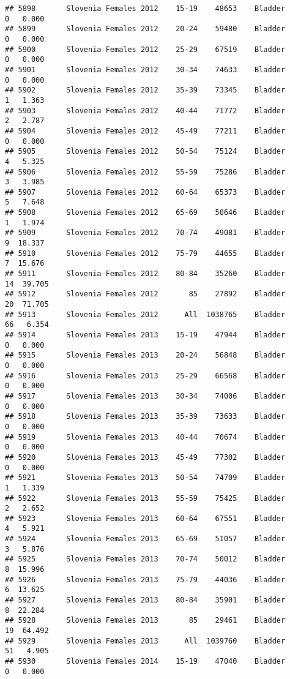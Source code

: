 \documentclass[
]{article}
\begin{document}
\begin{verbatim}
## 5898       Slovenia Females 2012    15-19    48653    Bladder      0   0.000
## 5899       Slovenia Females 2012    20-24    59480    Bladder      0   0.000
## 5900       Slovenia Females 2012    25-29    67519    Bladder      0   0.000
## 5901       Slovenia Females 2012    30-34    74633    Bladder      0   0.000
## 5902       Slovenia Females 2012    35-39    73345    Bladder      1   1.363
## 5903       Slovenia Females 2012    40-44    71772    Bladder      2   2.787
## 5904       Slovenia Females 2012    45-49    77211    Bladder      0   0.000
## 5905       Slovenia Females 2012    50-54    75124    Bladder      4   5.325
## 5906       Slovenia Females 2012    55-59    75286    Bladder      3   3.985
## 5907       Slovenia Females 2012    60-64    65373    Bladder      5   7.648
## 5908       Slovenia Females 2012    65-69    50646    Bladder      1   1.974
## 5909       Slovenia Females 2012    70-74    49081    Bladder      9  18.337
## 5910       Slovenia Females 2012    75-79    44655    Bladder      7  15.676
## 5911       Slovenia Females 2012    80-84    35260    Bladder     14  39.705
## 5912       Slovenia Females 2012       85    27892    Bladder     20  71.705
## 5913       Slovenia Females 2012      All  1038765    Bladder     66   6.354
## 5914       Slovenia Females 2013    15-19    47944    Bladder      0   0.000
## 5915       Slovenia Females 2013    20-24    56848    Bladder      0   0.000
## 5916       Slovenia Females 2013    25-29    66568    Bladder      0   0.000
## 5917       Slovenia Females 2013    30-34    74006    Bladder      0   0.000
## 5918       Slovenia Females 2013    35-39    73633    Bladder      0   0.000
## 5919       Slovenia Females 2013    40-44    70674    Bladder      0   0.000
## 5920       Slovenia Females 2013    45-49    77302    Bladder      0   0.000
## 5921       Slovenia Females 2013    50-54    74709    Bladder      1   1.339
## 5922       Slovenia Females 2013    55-59    75425    Bladder      2   2.652
## 5923       Slovenia Females 2013    60-64    67551    Bladder      4   5.921
## 5924       Slovenia Females 2013    65-69    51057    Bladder      3   5.876
## 5925       Slovenia Females 2013    70-74    50012    Bladder      8  15.996
## 5926       Slovenia Females 2013    75-79    44036    Bladder      6  13.625
## 5927       Slovenia Females 2013    80-84    35901    Bladder      8  22.284
## 5928       Slovenia Females 2013       85    29461    Bladder     19  64.492
## 5929       Slovenia Females 2013      All  1039760    Bladder     51   4.905
## 5930       Slovenia Females 2014    15-19    47040    Bladder      0   0.000

\end{verbatim}
\end{document}
